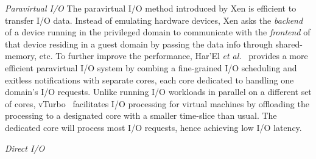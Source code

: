 \emph{Paravirtual I/O} The paravirtual I/O method introduced by Xen is efficient to transfer I/O data. Instead of emulating hardware devices, Xen asks the \emph{backend} of a device running in the privileged domain to communicate with the \emph{frontend} of that device residing in a guest domain by passing the data info through shared-memory, etc. To further improve the performance, Har'El \emph{et al.}~\cite{har2013efficient} provides a more efficient paravirtual I/O system by combing a fine-grained I/O scheduling and exitless notifications with separate cores, each core dedicated to handling one domain's I/O requests. Unlike running I/O workloads in parallel on a different set of cores, vTurbo~\cite{xu2013vturbo} facilitates I/O processing for virtual machines by offloading the processing to a designated core with a smaller time-slice than usual. The dedicated core will process most I/O requests, hence achieving low I/O latency.

\emph{Direct I/O}


